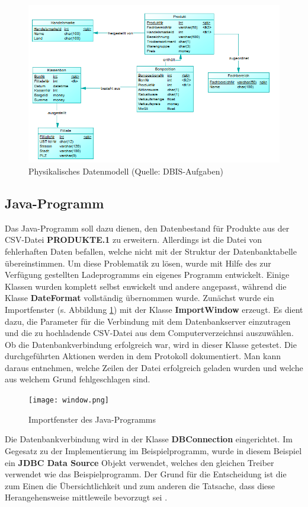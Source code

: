 \begin{figure}[ht!]
  \centering
  \includegraphics[width=1.2\linewidth]{pictures/phys_data.png}
  \caption[Physikalisches Datenmodell]{Physikalisches Datenmodell (Quelle: DBIS-Aufgaben)}
\end{figure}

\subsection{Java-Programm}

Das Java-Programm soll dazu dienen, den Datenbestand für Produkte aus der CSV-Datei \textbf{PRODUKTE.1} zu erweitern. Allerdings ist die Datei von fehlerhaften Daten befallen, welche nicht mit der Struktur der Datenbanktabelle übereinstimmen. Um diese Problematik zu lösen, wurde mit Hilfe des zur Verfügung gestellten Ladeprogramms ein eigenes Programm entwickelt. Einige Klassen wurden komplett selbst enwickelt und andere angepasst, während die Klasse \textbf{DateFormat} vollständig übernommen wurde.
Zunächst wurde ein Importfenster (s. Abbildung \ref{import}) mit der Klasse \textbf{ImportWindow} erzeugt. Es dient dazu, die Parameter für die Verbindung mit dem Datenbankserver einzutragen und die zu hochladende CSV-Datei aus dem Computerverzeichnsi auszuwählen. Ob die Datenbankverbindung erfolgreich war, wird in dieser Klasse getestet. Die durchgeführten Aktionen werden in dem Protokoll dokumentiert. Man kann daraus entnehmen, welche Zeilen der Datei erfolgreich geladen wurden und welche aus welchem Grund fehlgeschlagen sind.
\begin{figure}[ht!]
  \texttt{[image: window.png]}
  \caption{Importfenster des Java-Programms}
  \label{import}
\end{figure}
Die Datenbankverbindung wird in der Klasse \textbf{DBConnection} eingerichtet. Im Gegesatz zu der Implementierung im Beispielprogramm, wurde in diesem Beispiel ein \textbf{JDBC Data Source} Objekt verwendet, welches den gleichen Treiber verwendet wie das Beispielprogramm. Der Grund für die Entscheidung ist die zum Einen die Übersichtlichkeit und zum anderen die Tatsache, dass diese Herangehensweise mittleweile bevorzugt sei \citep{Wulff2019}.

